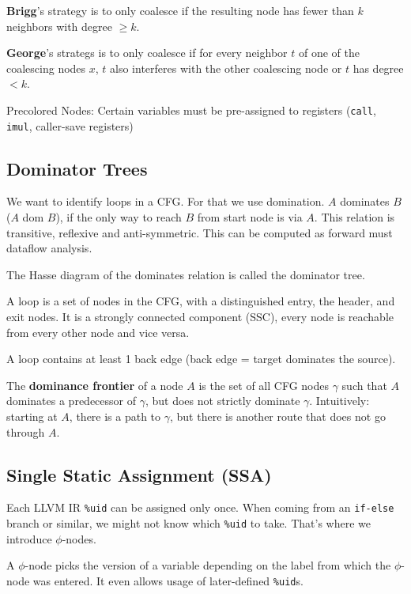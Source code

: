 \textbf{Brigg}'s strategy is to only coalesce if the resulting node has fewer than $k$ neighbors with degree $\geq k$. \medskip

\textbf{George}'s strategs is to only coalesce if for every neighbor $t$ of one of the coalescing nodes $x$, $t$ also interferes with the other coalescing node or $t$ has degree $< k$.\medskip
	
Precolored Nodes: Certain variables must be pre-assigned to registers (\texttt{call}, \texttt{imul}, caller-save registers)



\subsection*{Dominator Trees}

We want to identify loops in a CFG. For that we use domination. $A$ dominates $B$ ($A$ dom $B$), if the only way to reach $B$ from start node is via $A$. This relation is transitive, reflexive and anti-symmetric. This can be computed as forward must dataflow analysis.\medskip

The Hasse diagram of the dominates relation is called the dominator tree.\medskip

A loop is a set of nodes in the CFG, with a distinguished entry, the header, and exit nodes. It is a strongly connected component (SSC), every node is reachable from every other node and vice versa.\medskip

A loop contains at least 1 back edge (back edge = target dominates the source).\medskip

The \textbf{dominance frontier} of a node $A$ is the set of all CFG nodes $\gamma$ such that $A$ dominates a predecessor of $\gamma$, but does not strictly dominate $\gamma$. Intuitively: starting at $A$, there is a path to $\gamma$, but there is another route that does not go through $A$.


\subsection*{Single Static Assignment (SSA)}

Each LLVM IR \texttt{\%uid} can be assigned only once. When coming from an \texttt{if-else} branch or similar, we might not know which \texttt{\%uid} to take. That's where we introduce $\phi$-nodes.\medskip

A $\phi$-node picks the version of a variable depending on the label from which the $\phi$-node was entered. It even allows usage of later-defined \texttt{\%uid}s.\medskip

